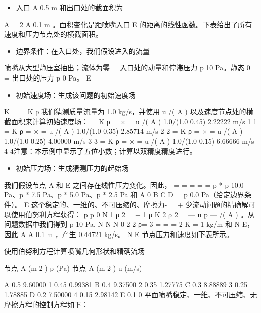 \documentclass[11pt,a4paper,openany,fontset=none]{ctexbook}
\begin{document}
\begin{itemize}

\item 入口 A 0.5 m 和出口处的截面积为

\end{itemize}

A = 2 A 0.1 m 。面积变化是距喷嘴入口 E 的距离的线性函数。下表给出了所有速度和压力节点处的横截面积。

\begin{itemize}

\item 边界条件：在入口处，我们假设进入的流量

\end{itemize}

喷嘴从大型静压室抽出；流体为零 = 入口处的动量和停滞压力 p 10 Pa。静态 0 = 出口处的压力 p 0 Pa。 E

\begin{itemize}

\item 初始速度场：生成该问题的初始速度场

\end{itemize}

K = = K ρ 我们猜测质量流量为 1.0 kg/s，并使用 u /( A ) 以及速度节点处的横截面积来计算初始速度场： = K ρ = × = u /( A ) 1.0/(1.0 0.45) 2.22222 m/s 1 1 = K ρ = × = u /( A ) 1.0/(1.0 0.35) 2.85714 m/s 2 2 = K ρ = × = u /( A ) 1.0/(1.0 0.25) 4.00000 m/s 3 3 = K ρ = × = u /( A ) 1.0/(1.0 0.15) 6.66666 m/s 4 4注意：本示例中显示了五位小数；计算以双精度精度进行。

\begin{itemize}

\item 初始压力场：生成猜测压力的起始场

\end{itemize}

我们假设节点 A 和 E 之间存在线性压力变化。因此， = = = = = p * p 10.0 Pa、p * 7.5 Pa、p * 5.0 Pa、p * 2.5 Pa 和 A 0 B C D = p 0.0 Pa（给定边界条件）。 E 这个稳定的、一维的、不可压缩的、摩擦力- = + 少流动问题的精确解可以使用伯努利方程获得： p p 0 N 1 ρ 2 = + 1 ρ K 2 ρ 2 = — u p — /( A ) 。从问题数据中我们得到 p 10 Pa, N N N 0 2 2 ρ= 3 = = = 2 K = 1 kg/m 和 N E，因此 A A 0.1 m ，产生 0.44721 kg/s。 N E 节点压力和速度如下表所示。

使用伯努利方程计算喷嘴几何形状和精确流场

节点 A (m 2 ) p (Pa) 节点 A (m 2 ) u (m/s)

A 0.5 9.60000 1 0.45 0.99381 B 0.4 9.37500 2 0.35 1.27775 C 0.3 8.88889 3 0.25 1.78885 D 0.2 7.50000 4 0.15 2.98142 E 0.1 0
平面喷嘴稳定、一维、不可压缩、无摩擦方程的控制方程如下：
\end{document}
